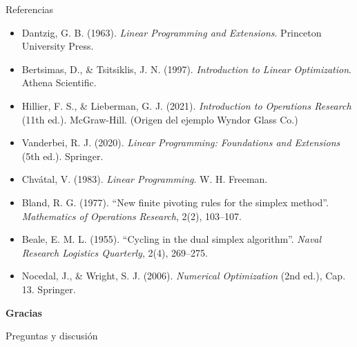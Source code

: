 \documentclass[aspectratio=169]{beamer}
\begin{document}
\begin{frame}{Referencias}
\small
\begin{itemize}
\setlength{\itemsep}{1pt}
\item Dantzig, G. B. (1963). \emph{Linear Programming and Extensions}. Princeton University Press.
\item Bertsimas, D., \& Tsitsiklis, J. N. (1997). \emph{Introduction to Linear Optimization}. Athena Scientific.
\item Hillier, F. S., \& Lieberman, G. J. (2021). \emph{Introduction to Operations Research} (11th ed.). McGraw-Hill. (Origen del ejemplo Wyndor Glass Co.)
\item Vanderbei, R. J. (2020). \emph{Linear Programming: Foundations and Extensions} (5th ed.). Springer.
\item Chvátal, V. (1983). \emph{Linear Programming}. W. H. Freeman.
\item Bland, R. G. (1977). ``New finite pivoting rules for the simplex method''. \emph{Mathematics of Operations Research}, 2(2), 103--107.
\item Beale, E. M. L. (1955). ``Cycling in the dual simplex algorithm''. \emph{Naval Research Logistics Quarterly}, 2(4), 269--275.
\item Nocedal, J., \& Wright, S. J. (2006). \emph{Numerical Optimization} (2nd ed.), Cap. 13. Springer.
\end{itemize}
\end{frame}

\begin{frame}{}
\centering
{\Large\textbf{Gracias}}

\vspace{0.4cm}
\normalsize Preguntas y discusión
\end{frame}
\end{document}

